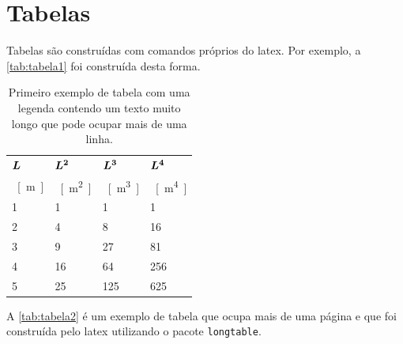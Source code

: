 \section{Tabelas}\label{sec:tabelas}

Tabelas são construídas com comandos próprios do \gls{latex}. Por exemplo, a \autoref{tab:tabela1} foi construída desta forma.

\begin{table}[htb]%
\caption{Primeiro exemplo de tabela com uma legenda contendo um texto muito longo que pode ocupar mais de uma linha.}%
\label{tab:tabela1}%
\begin{tabularx}{\textwidth}{@{\extracolsep{\fill}}llll}%
\toprule
$\boldsymbol{L}$ & $\boldsymbol{L^2}$ & $\boldsymbol{L^3}$ & $\boldsymbol{L^4}$ \\
\SI{}{[m]} & \SI{}{[m^2]} & \SI{}{[m^3]} & \SI{}{[m^4]} \\ \midrule
1          & 1            & 1            & 1            \\
2          & 4            & 8            & 16           \\
3          & 9            & 27           & 81           \\
4          & 16           & 64           & 256          \\
5          & 25           & 125          & 625          \\ \bottomrule
\end{tabularx}
\end{table}

A \autoref{tab:tabela2} é um exemplo de tabela que ocupa mais de uma página e que foi construída pelo \gls{latex} utilizando o pacote \texttt{longtable}.

